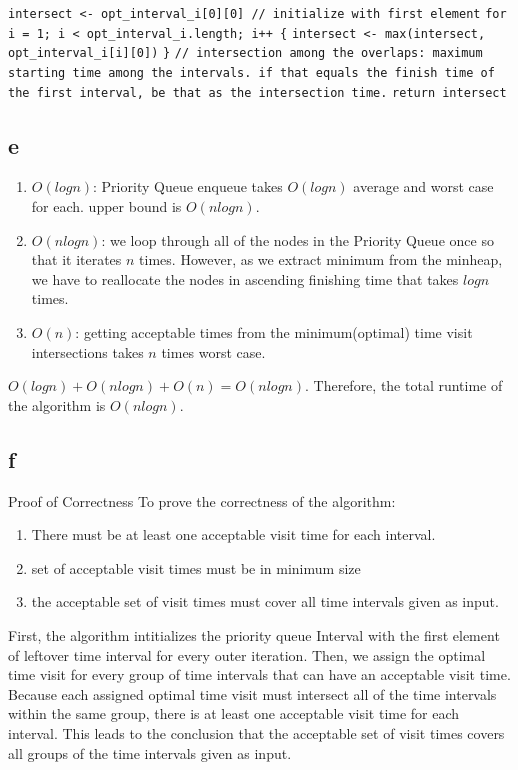 \documentclass[11pt]{article}
\begin{document}
\begin{algorithm}[H]
\small
\SetAlgoNoEnd
\DontPrintSemicolon
\caption{intersection(opt\_interval\_i)}
\texttt{intersect <- opt\_interval\_i[0][0] // initialize with first element}\;
\texttt{for i = 1; i < opt\_interval\_i.length; i++ \{}\;
\Indp
\texttt{intersect <- max(intersect, opt\_interval\_i[i][0])}\;
\Indm
\texttt{\}}\;
\texttt{// intersection among the overlaps: maximum starting time among the intervals. if that equals the finish time of the first interval, be that as the intersection time.}\;
\texttt{return intersect}\;
\end{algorithm}

\subsection{e}
\begin{enumerate}
\item $O(logn)$: Priority Queue enqueue takes $O(logn)$ average and worst case for each. upper bound is $O(nlogn)$.
\item $O(nlogn)$: we loop through all of the nodes in the Priority Queue once so that it iterates $n$ times. However, as we extract minimum from the minheap, we have to reallocate the nodes in ascending finishing time that takes $logn$ times.
\item $O(n)$: getting acceptable times from the minimum(optimal) time visit intersections takes $n$ times worst case.
\end{enumerate}

$O(logn) + O(nlogn) + O(n) = O(nlogn)$.
Therefore, the total runtime of the algorithm is $O(nlogn)$.

\subsection{f}
Proof of Correctness
To prove the correctness of the algorithm:
\begin{enumerate}
\item There must be at least one acceptable visit time for each interval.
\item set of acceptable visit times must be in minimum size
\item the acceptable set of visit times must cover all time intervals given as input.
\end{enumerate}

First, the algorithm intitializes the priority queue Interval with the first element of leftover time interval for every outer iteration. Then, we assign the optimal time visit for every group of time intervals that can have an acceptable visit time. Because each assigned optimal time visit must intersect all of the time intervals within the same group, there is at least one acceptable visit time for each interval. This leads to the conclusion that the acceptable set of visit times covers all groups of the time intervals given as input. 
\end{document}

